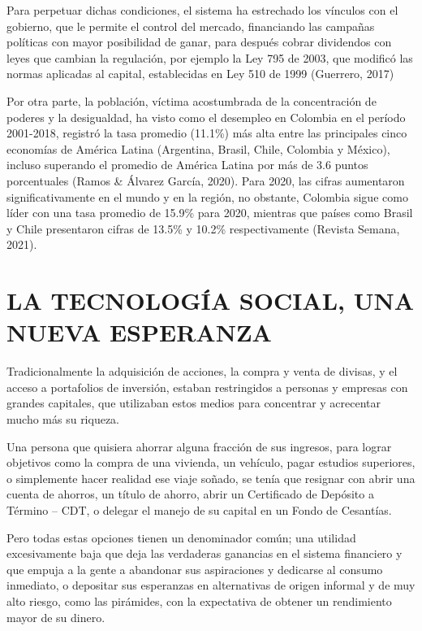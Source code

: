 \documentclass[
]{book}
\begin{document}
Para perpetuar dichas condiciones, el sistema ha estrechado los vínculos con el gobierno, que le permite el control del mercado, financiando las campañas políticas con mayor posibilidad de ganar, para después cobrar dividendos con leyes que cambian la regulación, por ejemplo la Ley 795 de 2003, que modificó las normas aplicadas al capital, establecidas en Ley 510 de 1999 (Guerrero, 2017)

Por otra parte, la población, víctima acostumbrada de la concentración de poderes y la desigualdad, ha visto como el desempleo en Colombia en el período 2001-2018, registró la tasa promedio (11.1\%) más alta entre las principales cinco economías de América Latina (Argentina, Brasil, Chile, Colombia y México), incluso superando el promedio de América Latina por más de 3.6 puntos porcentuales (Ramos \& Álvarez García, 2020). Para 2020, las cifras aumentaron significativamente en el mundo y en la región, no obstante, Colombia sigue como líder con una tasa promedio de 15.9\% para 2020, mientras que países como Brasil y Chile presentaron cifras de 13.5\% y 10.2\% respectivamente (Revista Semana, 2021).

\hypertarget{la-tecnologuxeda-social-una-nueva-esperanza}{%
\chapter{LA TECNOLOGÍA SOCIAL, UNA NUEVA ESPERANZA}\label{la-tecnologuxeda-social-una-nueva-esperanza}}

Tradicionalmente la adquisición de acciones, la compra y venta de divisas, y el acceso a portafolios de inversión, estaban restringidos a personas y empresas con grandes capitales, que utilizaban estos medios para concentrar y acrecentar mucho más su riqueza.

Una persona que quisiera ahorrar alguna fracción de sus ingresos, para lograr objetivos como la compra de una vivienda, un vehículo, pagar estudios superiores, o simplemente hacer realidad ese viaje soñado, se tenía que resignar con abrir una cuenta de ahorros, un título de ahorro, abrir un Certificado de Depósito a Término -- CDT, o delegar el manejo de su capital en un Fondo de Cesantías.

Pero todas estas opciones tienen un denominador común; una utilidad excesivamente baja que deja las verdaderas ganancias en el sistema financiero y que empuja a la gente a abandonar sus aspiraciones y dedicarse al consumo inmediato, o depositar sus esperanzas en alternativas de origen informal y de muy alto riesgo, como las pirámides, con la expectativa de obtener un rendimiento mayor de su dinero.
\end{document}
